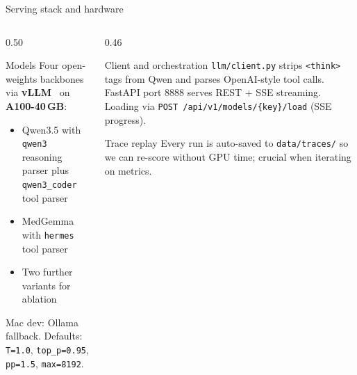 \documentclass[aspectratio=169,t]{beamer}
\begin{document}
\begin{frame}{Serving stack and hardware}
  \begin{columns}[T,onlytextwidth]
    \begin{column}{0.50\textwidth}
      \begin{block}{Models}
        \footnotesize
        Four open-weights backbones via \textbf{vLLM}~\cite{kwon2023vllm}
        on \textbf{A100-40\,GB}:
        \begin{itemize}\setlength\itemsep{0.05em}
          \item Qwen3.5 with \texttt{qwen3} reasoning parser plus
                \texttt{qwen3\_coder} tool parser
          \item MedGemma with \texttt{hermes} tool parser
          \item Two further variants for ablation
        \end{itemize}
        Mac dev: Ollama fallback.
        Defaults: \texttt{T=1.0}, \texttt{top\_p=0.95},
        \texttt{pp=1.5}, \texttt{max=8192}.
      \end{block}
    \end{column}%
    \hfill
    \begin{column}{0.46\textwidth}
      \begin{exampleblock}{Client and orchestration}
        \footnotesize
        \texttt{llm/client.py} strips \texttt{<think>} tags from Qwen
        and parses OpenAI-style tool calls. FastAPI port 8888 serves
        REST + SSE streaming. Loading via
        \texttt{POST /api/v1/models/\{key\}/load} (SSE progress).
      \end{exampleblock}
      \begin{alertblock}{Trace replay}
        \footnotesize
        Every run is auto-saved to \texttt{data/traces/} so we can
        re-score without GPU time; crucial when iterating on metrics.
      \end{alertblock}
    \end{column}
  \end{columns}
\end{frame}
\end{document}
